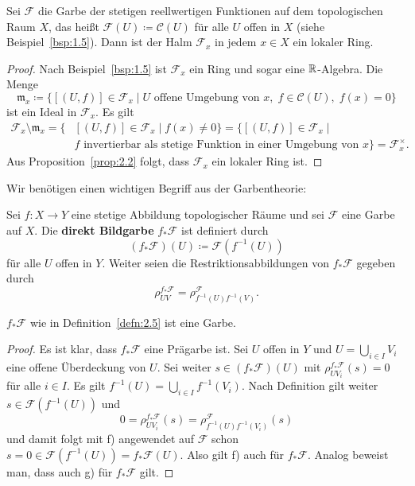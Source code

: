 \begin{bsp}
\label{bsp:2.4}
	Sei $\mathcal{F}$ die Garbe der stetigen reellwertigen Funktionen auf dem topologischen Raum $X$, das heißt $\mathcal{F}(U) \coloneqq \mathcal{C}(U)$ für alle $U$ offen in $X$ (siehe Beispiel~\ref{bsp:1.5}). Dann ist der Halm $\mathcal{F}_x$ in jedem $x \in X$ ein lokaler Ring.
	\begin{proof}
		Nach Beispiel~\ref{bsp:1.5} ist $\mathcal{F}_x$ ein Ring und sogar eine $\mathbb {R}$-Algebra. Die Menge
		\[
			\mathfrak{m}_x\coloneqq \{ [(U,f)] \in \mathcal{F}_x \mid U \text{ offene Umgebung von } x,\; f \in \mathcal{C}(U), \; f(x) = 0 \}
		\]
		ist ein Ideal in $\mathcal{F}_x$. Es gilt
		\begin{align*}
			\mathcal{F}_x \setminus \mathfrak{m}_x = \{ &[(U,f)] \in \mathcal{F}_x \mid f(x) \neq 0\} = \{[(U,f)] \in \mathcal{F}_x \mid\\
			&f \text{ invertierbar als stetige Funktion in einer Umgebung von } x \} = \mathcal{F}_x^\times.
		\end{align*}
		Aus Proposition~\ref{prop:2.2} folgt, dass $\mathcal{F}_x$ ein lokaler Ring ist.
	\end{proof}
\end{bsp}

Wir benötigen einen wichtigen Begriff aus der Garbentheorie:

\begin{defn}
\label{defn:2.5}
	Sei $f\colon X \to Y$ eine stetige Abbildung topologischer Räume und sei $\mathcal{F}$ eine Garbe auf $X$. Die \textbf{direkt Bildgarbe} $f_*\mathcal{F}$ ist definiert durch
	\[
		(f_*\mathcal{F})(U) \coloneqq \mathcal{F}(f^{-1}(U))
	\]
	für alle $U$ offen in $Y$. Weiter seien die Restriktionsabbildungen von $f_*\mathcal{F}$ gegeben durch 
	\[
		\rho_{UV}^{f_*\mathcal{F}} = \rho_{f^{-1}(U)f^{-1}(V)}^{\mathcal{F}}.
	\]
\end{defn}

\begin{prop}
\label{prop:2.6}
	$f_*\mathcal{F}$ wie in Definition~\ref{defn:2.5} ist eine Garbe.
	\begin{proof}
		Es ist klar, dass $f_*\mathcal{F}$ eine Prägarbe ist. Sei $U$ offen in $Y$ und $U = \bigcup_{i\in I}V_i$ eine offene Überdeckung von $U$. Sei weiter $s \in (f_*\mathcal{F})(U)$ mit $\rho_{UV_i}^{f_*\mathcal{F}}(s) = 0$ für alle $i \in I$. Es gilt $f^{-1}(U) = \bigcup_{i\in I} f^{-1}(V_i)$. Nach Definition gilt weiter $s \in \mathcal{F}(f^{-1}(U))$ und
		\[
			0 = \rho_{UV_i}^{f_*\mathcal{F}}(s) = \rho_{f^{-1}(U)f^{-1}(V_i)}^{\mathcal{F}}(s)
		\]
		und damit folgt mit f) angewendet auf $\mathcal{F}$ schon $s=0 \in \mathcal{F}(f^{-1}(U)) = f_*\mathcal{F}(U)$. Also gilt f) auch für $f_*\mathcal{F}$. Analog beweist man, dass auch g) für $f_*\mathcal{F}$ gilt.
	\end{proof}
\end{prop}

